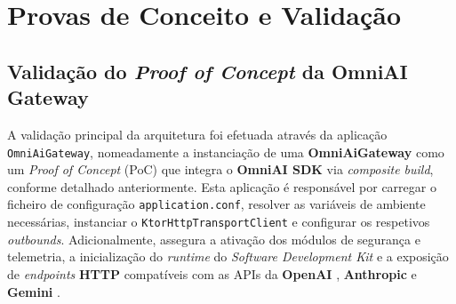     \chapter{Provas de Conceito e Validação}

    \section{Validação do \textit{Proof of Concept} da OmniAI Gateway}
    A validação principal da arquitetura foi efetuada através da aplicação \texttt{OmniAiGateway}, nomeadamente a instanciação de uma \textbf{OmniAiGateway} como um \textit{Proof of Concept} (PoC) que integra o \textbf{OmniAI SDK} via \textit{composite build}, conforme detalhado anteriormente. Esta aplicação é responsável por carregar o ficheiro de configuração \texttt{application.conf}, resolver as variáveis de ambiente necessárias, instanciar o \texttt{KtorHttpTransportClient} e configurar os respetivos \textit{outbounds}. Adicionalmente, assegura a ativação dos módulos de segurança e telemetria, a inicialização do \textit{runtime} do \textit{Software Development Kit} e a exposição de \textit{endpoints} \textbf{HTTP} compatíveis com as APIs da \textbf{OpenAI} \cite{openai_api}, \textbf{Anthropic} \cite{anthropic_api} e \textbf{Gemini} \cite{google_gemini_api}.
    
